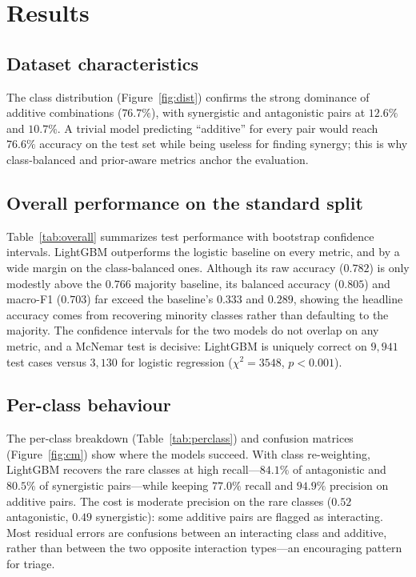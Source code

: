 \documentclass{bmcart}
\begin{document}
\section*{Results}

\subsection*{Dataset characteristics}
The class distribution (Figure~\ref{fig:dist}) confirms the strong dominance of additive combinations
($76.7\%$), with synergistic and antagonistic pairs at $12.6\%$ and $10.7\%$. A trivial model
predicting ``additive'' for every pair would reach $76.6\%$ accuracy on the test set while being
useless for finding synergy; this is why class-balanced and prior-aware metrics anchor the evaluation.

\subsection*{Overall performance on the standard split}
Table~\ref{tab:overall} summarizes test performance with bootstrap confidence intervals. LightGBM
outperforms the logistic baseline on every metric, and by a wide margin on the class-balanced ones.
Although its raw accuracy ($0.782$) is only modestly above the $0.766$ majority baseline, its balanced
accuracy ($0.805$) and macro-F1 ($0.703$) far exceed the baseline's $0.333$ and $0.289$, showing the
headline accuracy comes from recovering minority classes rather than defaulting to the majority. The
confidence intervals for the two models do not overlap on any metric, and a McNemar test is decisive:
LightGBM is uniquely correct on $9{,}941$ test cases versus $3{,}130$ for logistic regression
($\chi^2 = 3548$, $p<0.001$).

\subsection*{Per-class behaviour}
The per-class breakdown (Table~\ref{tab:perclass}) and confusion matrices (Figure~\ref{fig:cm}) show
where the models succeed. With class re-weighting, LightGBM recovers the rare classes at high
recall---$84.1\%$ of antagonistic and $80.5\%$ of synergistic pairs---while keeping $77.0\%$ recall and
$94.9\%$ precision on additive pairs. The cost is moderate precision on the rare classes
($0.52$ antagonistic, $0.49$ synergistic): some additive pairs are flagged as interacting. Most
residual errors are confusions between an interacting class and additive, rather than between the two
opposite interaction types---an encouraging pattern for triage.
\end{document}
